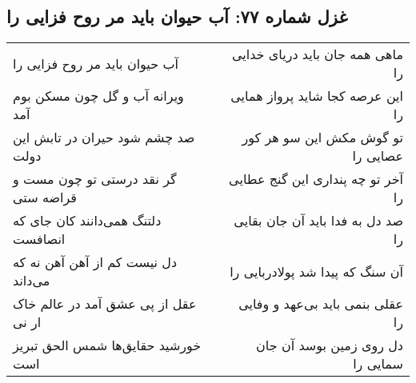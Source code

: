 \begin{center}
\section*{غزل شماره ۷۷: آب حیوان باید مر روح فزایی را}
\label{sec:0077}
\begin{longtable}{l p{0.5cm} r}
آب حیوان باید مر روح فزایی را
&&
ماهی همه جان باید دریای خدایی را
\\
ویرانه آب و گل چون مسکن بوم آمد
&&
این عرصه کجا شاید پرواز همایی را
\\
صد چشم شود حیران در تابش این دولت
&&
تو گوش مکش این سو هر کور عصایی را
\\
گر نقد درستی تو چون مست و قراضه ستی
&&
آخر تو چه پنداری این گنج عطایی را
\\
دلتنگ همی‌دانند کان جای که انصافست
&&
صد دل به فدا باید آن جان بقایی را
\\
دل نیست کم از آهن آهن نه که می‌داند
&&
آن سنگ که پیدا شد پولادربایی را
\\
عقل از پی عشق آمد در عالم خاک ار نی
&&
عقلی بنمی باید بی‌عهد و وفایی را
\\
خورشید حقایق‌ها شمس الحق تبریز است
&&
دل روی زمین بوسد آن جان سمایی را
\\
\end{longtable}
\end{center}
